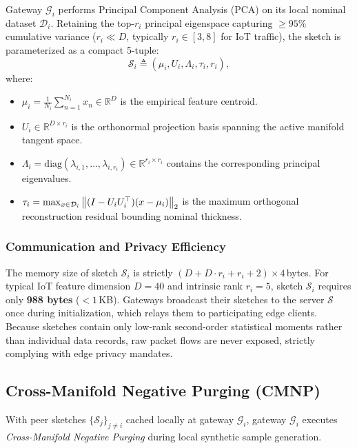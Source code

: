 Gateway $\mathcal{G}_i$ performs Principal Component Analysis (PCA) on its local nominal dataset $\mathcal{D}_i$. Retaining the top-$r_i$ principal eigenspace capturing $\ge 95\%$ cumulative variance ($r_i \ll D$, typically $r_i \in [3, 8]$ for IoT traffic), the sketch is parameterized as a compact 5-tuple:
\begin{equation}
\label{eq:fsds_tuple}
\mathcal{S}_i \triangleq \left( \mu_i, U_i, \Lambda_i, \tau_i, r_i \right),
\end{equation}
where:
\begin{itemize}
    \item $\mu_i = \frac{1}{N_i}\sum_{n=1}^{N_i} x_n \in \mathbb{R}^D$ is the empirical feature centroid.
    \item $U_i \in \mathbb{R}^{D \times r_i}$ is the orthonormal projection basis spanning the active manifold tangent space.
    \item $\Lambda_i = \text{diag}(\lambda_{i,1}, \dots, \lambda_{i,r_i}) \in \mathbb{R}^{r_i \times r_i}$ contains the corresponding principal eigenvalues.
    \item $\tau_i = \max_{x \in \mathcal{D}_i} \left\lVert(I - U_i U_i^\top)(x - \mu_i)\right\rVert_2$ is the maximum orthogonal reconstruction residual bounding nominal thickness.
\end{itemize}

\subsubsection{Communication and Privacy Efficiency}
The memory size of sketch $\mathcal{S}_i$ is strictly $(D + D \cdot r_i + r_i + 2) \times 4$\,bytes. For typical IoT feature dimension $D = 40$ and intrinsic rank $r_i = 5$, sketch $\mathcal{S}_i$ requires only \textbf{988 bytes} ($<1$\,KB). Gateways broadcast their sketches to the server $\mathcal{S}$ once during initialization, which relays them to participating edge clients. Because sketches contain only low-rank second-order statistical moments rather than individual data records, raw packet flows are never exposed, strictly complying with edge privacy mandates.

\subsection{Cross-Manifold Negative Purging (CMNP)}
\label{subsec:cmnp}

With peer sketches $\{\mathcal{S}_j\}_{j \neq i}$ cached locally at gateway $\mathcal{G}_i$, gateway $\mathcal{G}_i$ executes \emph{Cross-Manifold Negative Purging} during local synthetic sample generation.

